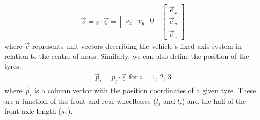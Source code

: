 \documentclass[11pt]{article}
\numberwithin{equation}{section}
\begin{document}
\begin{gather}
    \vec{v} = \underline{v}\cdot \vec{\underline{e}} = \begin{bmatrix}
        v_x & v_y & 0
    \end{bmatrix} \begin{bmatrix}
        \vec{e}_x\\
        \vec{e}_y\\
        \vec{e}_z
    \end{bmatrix}
\end{gather}
where $\vec{\underline{e}}$ represents unit vectors describing the vehicle's fixed axis system in relation to the centre of mass. Similarly, we can also define the position of the tyres.
\begin{gather}
    \vec{p}_i = \underline{p}_i \cdot \vec{\underline{e}} \textrm{ for } i = 1,\, 2, \, 3
\end{gather}
where $\vec{p}_i$ is a column vector with the position coordinates of a given tyre. These are a function of the front and rear wheelbases ($l_f$ and $l_r$) and the half of the front axle length ($s_1$).
\end{document}
